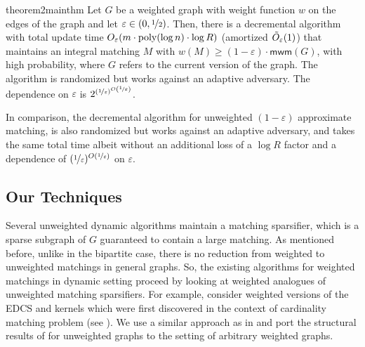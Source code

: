 \documentclass[a4paper,11pt]{article}
\newcommand{\paren}[1]{\left ( #1 \right )}
\newcommand{\poly}{\mbox{\rm poly}}
\newcommand{\eps}{\varepsilon}
\theoremstyle{definition}
\theoremstyle{definition}
\theoremstyle{definition}
\theoremstyle{definition}
\newtheorem{theorem2}[definition2]{Theorem}
\theoremstyle{definition}
\theoremstyle{definition}
\theoremstyle{definition}
\theoremstyle{definition}
\theoremstyle{definition}
\theoremstyle{definition}
\theoremstyle{definition}
\theoremstyle{definition}
\theoremstyle{definition}
\theoremstyle{definition}
\theoremstyle{definition}
\begin{document}


\begin{restatable}{theorem2}{mainthm}\label{thm:main}
Let $G$ be a weighted graph with weight function $w$ on the edges of the graph and let $\eps\in (0,\nicefrac{1}{2})$. Then, there is a decremental algorithm with total update time $O_{\varepsilon}(m\cdot\poly(\log n)\cdot\log R)$ (amortized $\Tilde{O}_{\varepsilon}(1)$) that maintains an integral matching $M$ with $w(M)\geqslant (1-\varepsilon)\cdot \textsf{mwm}(G)$, with high probability, where $G$ refers to the current version of the graph. The algorithm is randomized but works against an adaptive adversary. The dependence on $\eps$ is $2^{{\paren{\nicefrac{1}{\varepsilon}}}^{O\paren{\nicefrac{1}{\varepsilon}}}}$.
\end{restatable}

In comparison, the decremental algorithm for unweighted $(1-\eps)$ approximate matching, is also randomized but works against an adaptive adversary, and takes the same total time albeit without an additional loss of a $\log R$ factor and a dependence of $(\nicefrac{1}{\eps})^{O(\nicefrac{1}{\eps})}$ on $\eps$. 


\subsection{Our Techniques}

Several unweighted dynamic algorithms maintain a matching sparsifier, which is a sparse subgraph of $G$ guaranteed to contain a large matching. As mentioned before, unlike in the bipartite case, there is no reduction from weighted to unweighted matchings in general graphs. So, the existing algorithms for weighted matchings in dynamic setting proceed by looking at weighted analogues of unweighted matching sparsifiers. For example, \cite{BernsteinDL21} consider weighted versions of the EDCS and kernels which were first discovered in the context of cardinality matching problem (see \cite{BS15,BS16,BHI15}). We use a similar approach as in \cite{BernsteinDL21} and port the structural results of \cite{AssadiBD22} for unweighted graphs to the setting of arbitrary weighted graphs. 
\end{document}
